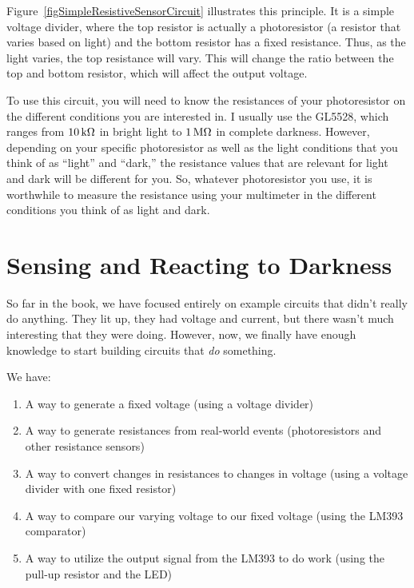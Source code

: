 
Figure~\ref{figSimpleResistiveSensorCircuit} illustrates this principle.
It is a simple voltage divider, where the top resistor is actually a photoresistor (a resistor that varies based on light) and the bottom resistor has a fixed resistance.
Thus, as the light varies, the top resistance will vary.
This will change the ratio between the top and bottom resistor, which will affect the output voltage.

To use this circuit, you will need to know the resistances of your photoresistor on the different conditions you are interested in.
I usually use the GL5528, which ranges from $10\,\si{\kilo\ohm}$ in bright light to $1\,\si{\mega\ohm}$ in complete darkness.
However, depending on your specific photoresistor as well as the light conditions that you think of as ``light'' and ``dark,'' the resistance values that are relevant for light and dark will be different for you.
So, whatever photoresistor you use, it is worthwhile to measure the resistance using your multimeter in the different conditions you think of as light and dark.

\section{Sensing and Reacting to Darkness}

So far in the book, we have focused entirely on example circuits that didn't really do anything.
They lit up, they had voltage and current, but there wasn't much interesting that they were doing.
However, now, we finally have enough knowledge to start building circuits that \emph{do} something.

We have:
\begin{enumerate}
\item A way to generate a fixed voltage (using a voltage divider)
\item A way to generate resistances from real-world events (photoresistors and other resistance sensors)
\item A way to convert changes in resistances to changes in voltage (using a voltage divider with one fixed resistor)
\item A way to compare our varying voltage to our fixed voltage (using the LM393 comparator)
\item A way to utilize the output signal from the LM393 to do work (using the pull-up resistor and the LED)
\end{enumerate}


